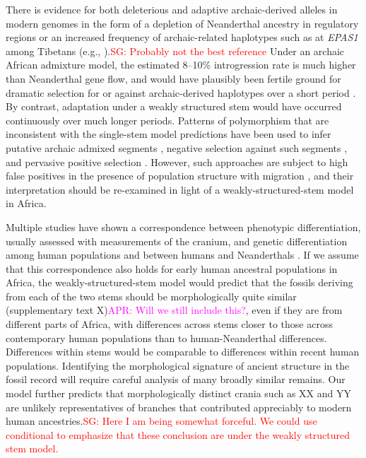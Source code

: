 \documentclass{article}
\newcommand{\sgcomment}[1]{{\textcolor{red}{SG: #1}}}
\newcommand{\aprcomment}[1]{{\textcolor{magenta}{APR: #1}}}
\begin{document}
There is evidence for both deleterious and adaptive archaic-derived alleles in
modern genomes in the form of a depletion of Neanderthal ancestry in regulatory
regions \citep{Petr2019-xo} or an increased frequency of archaic-related
haplotypes such as at \emph{EPAS1} among Tibetans (e.g.,
\citet{Zhang2021-xx}).\sgcomment{Probably not the best reference} Under an
archaic African admixture model, the estimated 8--10\% introgression rate is
much higher than Neanderthal gene flow, and would have plausibly been fertile
ground for dramatic selection for or against archaic-derived haplotypes over a
short period \citep{Wall2019-ao}. By contrast, adaptation under a weakly
structured stem would have occurred continuously over much longer periods.
Patterns of polymorphism that are inconsistent with the single-stem model
predictions have been used to infer putative archaic admixed segments
\citep{Plagnol2006-lt,Hsieh2016-gk,Wall2019-ao,Durvasula2020-td}, negative
selection against such segments \citep{Wall2019-ao}, and pervasive positive
selection \citep{Schrider2017-kl}. However, such approaches are subject to high
false positives in the presence of population structure with migration
\citep{Petr2019-xo}, and their interpretation should be re-examined in light of
a weakly-structured-stem model in Africa.

Multiple studies have shown a correspondence between phenotypic
differentiation, usually assessed with measurements of the cranium, and genetic
differentiation among human populations and between humans and Neanderthals
\citep{Relethford1994-mh,Weaver2008-ho,Von_Cramon-Taubadel2009-zb}. If we
assume that this correspondence also holds for early human ancestral
populations in Africa, the weakly-structured-stem model would predict that the
fossils deriving from each of the two stems should be morphologically quite
similar (supplementary text X)\aprcomment{Will we still include this?}, even if
they are from different parts of Africa, with differences across stems closer
to those across contemporary human populations than to human-Neanderthal
differences. Differences within stems would be comparable to differences within
recent human populations. Identifying the morphological signature of ancient
structure in the fossil record will require careful analysis of many broadly
similar remains. Our model further predicts that morphologically distinct
crania such as XX and YY are unlikely representatives of branches that
contributed appreciably to modern human ancestries.\sgcomment{Here I am being
somewhat forceful. We could use conditional to emphasize that these conclusion
are under the weakly structured stem model.}
\end{document}
